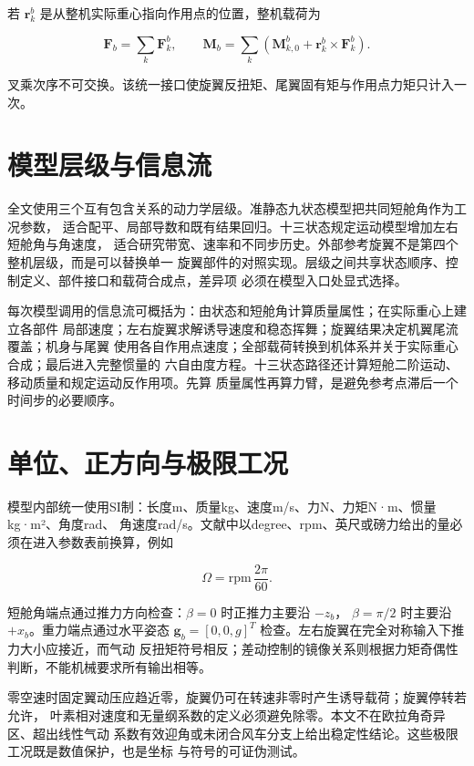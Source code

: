 \documentclass[UTF8,12pt,oneside,openany,fontset=windows]{ctexbook}
\begin{document}
若 \(\mathbf r_k^b\) 是从整机实际重心指向作用点的位置，整机载荷为

\begin{equation}
\mathbf F_b=\sum_k\mathbf F_k^b,\qquad
\mathbf M_b=\sum_k\left(\mathbf M_{k,0}^b+\mathbf r_k^b\times\mathbf F_k^b\right).
\end{equation}

叉乘次序不可交换。该统一接口使旋翼反扭矩、尾翼固有矩与作用点力矩只计入一次。

\section{模型层级与信息流}

全文使用三个互有包含关系的动力学层级。准静态九状态模型把共同短舱角作为工况参数， 适合配平、局部导数和既有结果回归。十三状态规定运动模型增加左右短舱角与角速度， 适合研究带宽、速率和不同步历史。外部参考旋翼不是第四个整机层级，而是可以替换单一 旋翼部件的对照实现。层级之间共享状态顺序、控制定义、部件接口和载荷合成点，差异项 必须在模型入口处显式选择。

每次模型调用的信息流可概括为：由状态和短舱角计算质量属性；在实际重心上建立各部件 局部速度；左右旋翼求解诱导速度和稳态挥舞；旋翼结果决定机翼尾流覆盖；机身与尾翼 使用各自作用点速度；全部载荷转换到机体系并关于实际重心合成；最后进入完整惯量的 六自由度方程。十三状态路径还计算短舱二阶运动、移动质量和规定运动反作用项。先算 质量属性再算力臂，是避免参考点滞后一个时间步的必要顺序。

\section{单位、正方向与极限工况}

模型内部统一使用SI制：长度m、质量kg、速度m/s、力N、力矩N·m、惯量kg·m²、角度rad、 角速度rad/s。文献中以degree、rpm、英尺或磅力给出的量必须在进入参数表前换算，例如

\begin{equation}
\Omega=\mathrm{rpm}\,\frac{2\pi}{60}.
\end{equation}

短舱角端点通过推力方向检查：\(\beta=0\) 时正推力主要沿 \(-z_b\)， \(\beta=\pi/2\) 时主要沿 \(+x_b\)。重力端点通过水平姿态 \(\mathbf g_b=[0,0,g]^T\) 检查。左右旋翼在完全对称输入下推力大小应接近，而气动 反扭矩符号相反；差动控制的镜像关系则根据力矩奇偶性判断，不能机械要求所有输出相等。

零空速时固定翼动压应趋近零，旋翼仍可在转速非零时产生诱导载荷；旋翼停转若允许， 叶素相对速度和无量纲系数的定义必须避免除零。本文不在欧拉角奇异区、超出线性气动 系数有效迎角或未闭合风车分支上给出稳定性结论。这些极限工况既是数值保护，也是坐标 与符号的可证伪测试。
\end{document}
